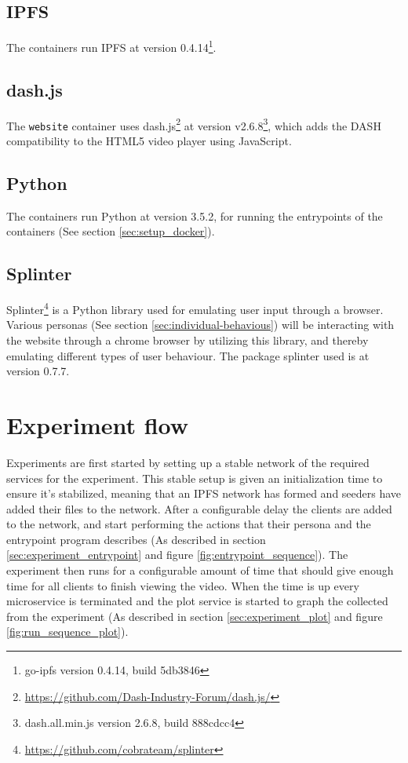 \subsection{IPFS}
\label{sec:setup_ipfs}
The containers run \acs{IPFS} at version 0.4.14\footnote{go-ipfs version 0.4.14, build 5db3846}.


\subsection{dash.js}
\label{sec:setup_dash.js}
The \texttt{website} container uses dash.js\footnote{\url{https://github.com/Dash-Industry-Forum/dash.js/}} at version v2.6.8\footnote{dash.all.min.js version 2.6.8, build 888cdcc4}, which adds the \ac{DASH} compatibility to the \acs{HTML}5 video player using JavaScript.


\subsection{Python}
\label{sec:setup_python}
The containers run Python at version 3.5.2, for running the entrypoints of the containers (See section \ref{sec:setup_docker}).


\subsection{Splinter}
\label{sec:setup_splinter}
Splinter\footnote{\url{https://github.com/cobrateam/splinter}} is a Python library used for emulating user input through a browser. Various personas (See section \ref{sec:individual-behavious}) will be interacting with the website through a chrome browser by utilizing this library, and thereby emulating different types of user behaviour.
The package splinter used is at version 0.7.7.



\section{Experiment flow}
Experiments are first started by setting up a stable network of the required services for the experiment. This stable setup is given an initialization time to ensure it's stabilized, meaning that an IPFS network has formed and seeders have added their files to the network.
After a configurable delay the clients are added to the network, and start performing the actions that their persona and the entrypoint program describes (As described in section \ref{sec:experiment_entrypoint} and figure \ref{fig:entrypoint_sequence}).
The experiment then runs for a configurable amount of time that should give enough time for all clients to finish viewing the video. When the time is up every microservice is terminated and the plot service is started to graph the collected from the experiment (As described in section \ref{sec:experiment_plot} and figure \ref{fig:run_sequence_plot}).

